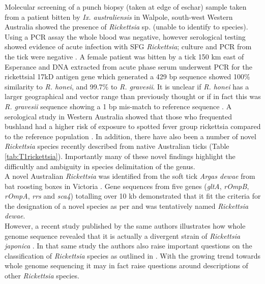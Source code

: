 \documentclass[a4paper, nobind]{templates/ociamthesis}
\begin{document}
Molecular screening of a punch biopsy (taken at edge of eschar) sample taken from a patient bitten by \emph{Ix. australiensis} in Walpole, south-west Western Australia showed the presence of \emph{Rickettsia} sp. (unable to identify to species).
Using a PCR assay the whole blood was negative, however serological testing showed evidence of acute infection with SFG \emph{Rickettsia}; culture and PCR from the tick were negative \autocite{rabyNewFociSpotted2016}.
A female patient was bitten by a tick 150 km east of Esperance and DNA extracted from acute phase serum underwent PCR for the rickettsial 17kD antigen gene which generated a 429 bp sequence showed 100\% similarity to \emph{R. honei}, and 99.7\% to \emph{R. gravesii}.
It is unclear if \emph{R. honei} has a larger geographical and vector range than previously thought or if in fact this was \emph{R. gravesii} sequence showing a 1 bp mis-match to reference sequence \autocite{rabyNewFociSpotted2016}.
A serological study in Western Australia showed that those who frequented bushland had a higher risk of exposure to spotted fever group rickettsia compared to the reference population \autocite{abdadSeroepidemiologicalStudyOutdoor2014}.
In addition, there have also been a number of novel \emph{Rickettsia} species recently described from native Australian ticks (Table \ref{tab:T1rickettsia}).
Importantly many of these novel findings highlight the difficultly and ambiguity in species delimitation of the genus.\\
A novel Australian \emph{Rickettsia} was identified from the soft tick \emph{Argas dewae} from bat roosting boxes in Victoria \autocite{izzardRickettsialesRickettsialDiseases2010}.
Gene sequences from five genes (\emph{gltA}, \emph{rOmpB}, \emph{rOmpA}, \emph{rrs} and \emph{sca4}) totalling over 10 kb demonstrated that it fit the criteria for the designation of a novel species as per \textcite{fournierGeneSequenceBasedCriteria2003} and was tentatively named \emph{Rickettsia dewae}.\\
However, a recent study published by the same authors illustrates how whole genome sequence revealed that it is actually a divergent strain of \emph{Rickettsia japonica} \autocite{izzardIsolationDivergentStrain2018}.
In that same study the authors also raise important questions on the classification of \emph{Rickettsia} species as outlined in \textcite{fournierGeneSequenceBasedCriteria2003}.
With the growing trend towards whole genome sequencing it may in fact raise questions around descriptions of other \emph{Rickettsia} species.
\end{document}
